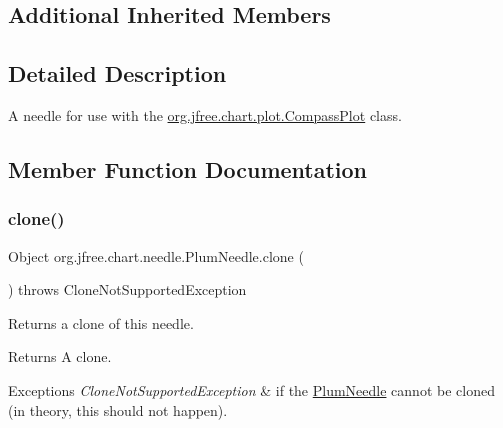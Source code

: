 \subsection*{Additional Inherited Members}


\subsection{Detailed Description}
A needle for use with the \mbox{\hyperlink{classorg_1_1jfree_1_1chart_1_1plot_1_1_compass_plot}{org.\+jfree.\+chart.\+plot.\+Compass\+Plot}} class. 

\subsection{Member Function Documentation}
\mbox{\label{classorg_1_1jfree_1_1chart_1_1needle_1_1_plum_needle_a7c2cb80d5ec6d03ee5487b2b6aabb2e3}} 
\subsubsection{\texorpdfstring{clone()}{clone()}}
{\footnotesize\ttfamily Object org.\+jfree.\+chart.\+needle.\+Plum\+Needle.\+clone (\begin{DoxyParamCaption}{ }\end{DoxyParamCaption}) throws Clone\+Not\+Supported\+Exception}

Returns a clone of this needle.

\begin{DoxyReturn}{Returns}
A clone.
\end{DoxyReturn}

\begin{DoxyExceptions}{Exceptions}
{\em Clone\+Not\+Supported\+Exception} & if the {\ttfamily \mbox{\hyperlink{classorg_1_1jfree_1_1chart_1_1needle_1_1_plum_needle}{Plum\+Needle}}} cannot be cloned (in theory, this should not happen). \\
\hline
\end{DoxyExceptions}
\mbox{\label{classorg_1_1jfree_1_1chart_1_1needle_1_1_plum_needle_a8349350ec66285c5d7575107404145e7}} 
